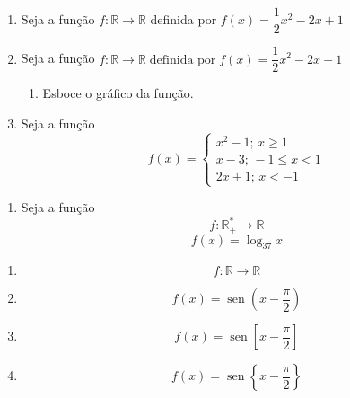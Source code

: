 \documentclass[a4paper, 12pt]{article}
\DeclareMathOperator{\sen}{sen}
\begin{document}
\begin{enumerate}
	\item Seja a função $f : \mathbb{R} \to \mathbb{R}$ definida por 
	$f(x) = \dfrac{1}{2}x^2 - 2x + 1$
	\item Seja a função 
	$f : \mathbb{R} \to \mathbb{R}\;
	\textrm{definida por}	\;
	f(x) = \dfrac{1}{2}x^2 - 2x + 1$
	
	\begin{enumerate}
	\item Esboce o gráfico da função.
	\end{enumerate}
	
	\item Seja a função 
		$$f(x) = 
		\begin{cases}
		x^2 - 1; \, x\geq 1 \\
		x-3; \, -1 \leq x<1 \\
		2x + 1; \, x< -1
		\end{cases}
			$$
\end{enumerate}

\begin{enumerate}
	\item Seja a função 
	$$ f: \mathbb{R}^*_+ \to \mathbb{R} $$
	$$
		f(x) = \log_{37} x	
	$$
\end{enumerate}

\begin{enumerate}
	\item $$ f: \mathbb{R} \to \mathbb{R} $$
	
	\item $$
		f(x) = \sen \left( x - \frac{\pi}{2} \right)
	$$
	\item $$
		f(x) = \sen \left[ x - \frac{\pi}{2} \right]
	$$
	\item $$
		f(x) = \sen \left\{ x - \frac{\pi}{2} \right\}
	$$
\end{enumerate}
\end{document}

